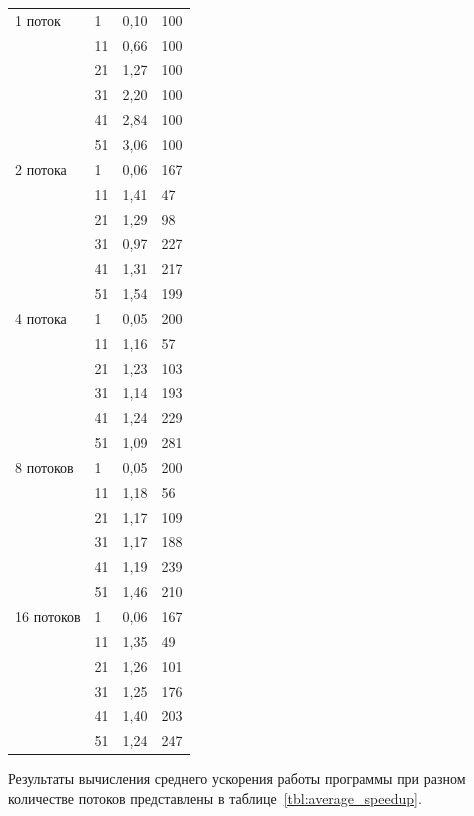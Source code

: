 \begin{longtable}{|p{3.5cm}|p{3.5cm}|p{5cm}|p{3cm}|}
1 поток & 1  & 0,10 & 100  \\ 
        & 11 & 0,66 & 100  \\ 
        & 21 & 1,27 & 100  \\ 
        & 31 & 2,20 & 100  \\ 
        & 41 & 2,84 & 100  \\ 
        & 51 & 3,06 & 100  \\ 
\hline
2 потока & 1  & 0,06 & 167  \\ 
         & 11 & 1,41 & 47   \\ 
         & 21 & 1,29 & 98   \\ 
         & 31 & 0,97 & 227  \\ 
         & 41 & 1,31 & 217  \\ 
         & 51 & 1,54 & 199  \\ 
\hline
4 потока & 1  & 0,05 & 200  \\ 
         & 11 & 1,16 & 57   \\ 
         & 21 & 1,23 & 103  \\ 
         & 31 & 1,14 & 193  \\ 
         & 41 & 1,24 & 229  \\ 
         & 51 & 1,09 & 281  \\ 
\hline
8 потоков & 1  & 0,05 & 200  \\ 
          & 11 & 1,18 & 56   \\ 
          & 21 & 1,17 & 109  \\ 
          & 31 & 1,17 & 188  \\ 
          & 41 & 1,19 & 239  \\ 
          & 51 & 1,46 & 210  \\ 
\hline
16 потоков & 1  & 0,06 & 167  \\ 
           & 11 & 1,35 & 49   \\ 
           & 21 & 1,26 & 101  \\ 
           & 31 & 1,25 & 176  \\ 
           & 41 & 1,40 & 203  \\ 
           & 51 & 1,24 & 247  \\ 
\hline

\end{longtable}

Результаты вычисления среднего ускорения работы программы при разном количестве потоков представлены в таблице~\ref{tbl:average_speedup}.


